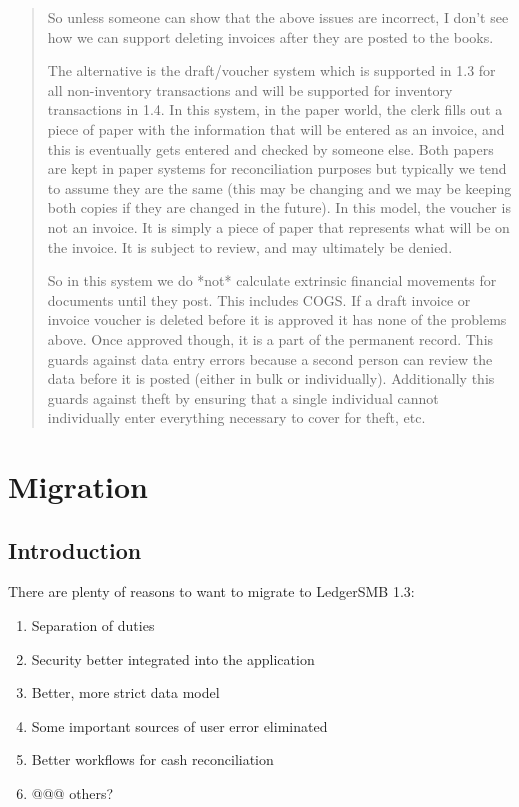 \begin{quote}
So unless someone can show that the above issues are incorrect, I don't see how we can support deleting invoices after they are posted to the books.

The alternative is the draft/voucher system which is supported in 1.3 for all non-inventory transactions and will be supported for inventory transactions in 1.4.  In this system, in the paper world, the clerk fills out a piece of paper with the information that will be entered as an invoice, and this is eventually gets entered and checked by someone else.  Both papers are kept in paper systems for reconciliation purposes but typically we tend to assume they are the same (this may be changing and we may be keeping both copies if they are changed in the future).  In this model, the voucher is not an invoice.  It is simply a piece of paper that represents what will be on the invoice.  It is subject to review, and may ultimately be denied.

So in this system we do *not* calculate extrinsic financial movements for documents until they post.  This includes COGS.  If a draft invoice or invoice voucher is deleted before it is approved it has none of the problems above.  Once approved though, it is a part of the permanent record.  This guards against data entry errors because a second person can review the data  before it is posted (either in bulk or individually).   Additionally this guards against theft by ensuring that a single individual cannot individually enter everything necessary to cover for theft, etc.
\end{quote}

\chapter{Migration}
\label{app-migration}

\section{Introduction}
\label{sec-migration-introduction}

There are plenty of reasons to want to migrate to LedgerSMB 1.3:

\begin{enumerate}
\item Separation of duties
\item Security better integrated into the application
\item Better, more strict data model
\label{item:StricterDataModel}
\item Some important sources of user error eliminated
\item Better workflows for cash reconciliation
\item @@@ others?
\end{enumerate}


